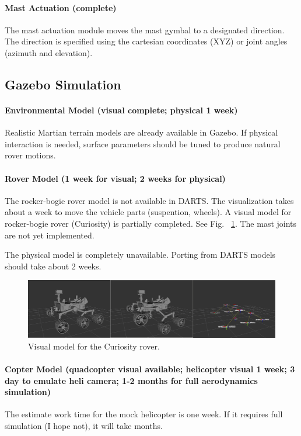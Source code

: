 \documentclass[conference]{IEEEtran}
\newcommand{\kyon}[1]{{\color{cyan} #1}}
\newcommand{\done}[1]{{\color{gray} #1}}
\begin{document}
\paragraph{Mast Actuation (complete)}
\done{
The mast actuation module moves the mast gymbal to a designated direction. The direction is specified using the cartesian coordinates (XYZ) or joint angles (azimuth and elevation). 
}



\subsection{Gazebo Simulation}

\paragraph{Environmental Model (visual complete; physical 1 week)}
Realistic Martian terrain models are already available in Gazebo. If physical interaction is needed, surface parameters should be tuned to produce natural rover motions. 

\paragraph{Rover Model (1 week for visual; 2 weeks for physical)}
The rocker-bogie rover model is not available in DARTS. The visualization takes about a week to move the vehicle parts (suspention, wheels).
\kyon{A visual model for rocker-bogie rover (Curiosity) is partially completed. See Fig.~ \ref{fig:msl_visual}. The mast joints are not yet implemented.}

The physical model is completely unavailable. Porting from DARTS models should take about 2 weeks.

\begin{figure}
    \centering
    \includegraphics[width=\textwidth]{figs/report6/msl_visual.png}
    \caption{Visual model for the Curiosity rover.}
    \label{fig:msl_visual}
\end{figure}



\paragraph{Copter Model (quadcopter visual available; helicopter visual 1 week; 3 day to emulate heli camera; 1-2 months for full aerodynamics simulation)}
The estimate work time for the mock helicopter is one week. If it requires full simulation (I hope not), it will take months. 
\end{document}
